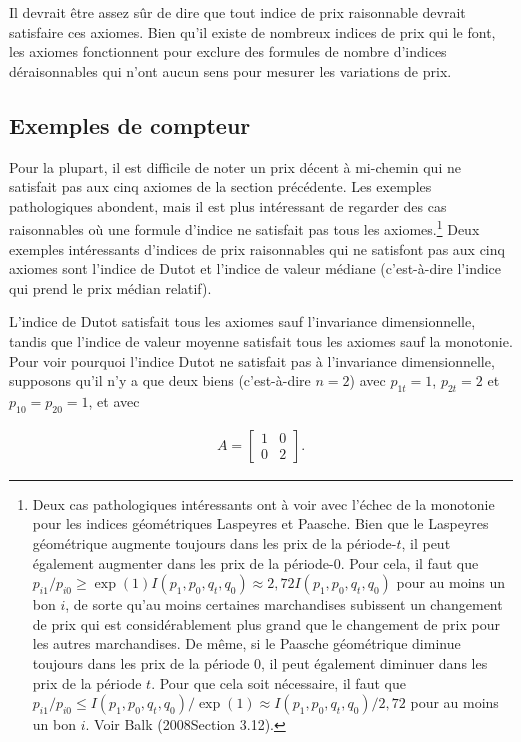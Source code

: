 \documentclass[
]{article}
\begin{document}
Il devrait être assez sûr de dire que tout indice de prix raisonnable devrait satisfaire ces axiomes. Bien qu'il existe de nombreux indices de prix qui le font, les axiomes fonctionnent pour exclure des formules de nombre d'indices déraisonnables qui n'ont aucun sens pour mesurer les variations de prix.

\hypertarget{exemples-de-compteur}{%
\subsection{Exemples de compteur}\label{exemples-de-compteur}}

Pour la plupart, il est difficile de noter un prix décent à mi-chemin qui ne satisfait pas aux cinq axiomes de la section précédente. Les exemples pathologiques abondent, mais il est plus intéressant de regarder des cas raisonnables où une formule d'indice ne satisfait pas tous les axiomes.\footnote{Deux cas pathologiques intéressants ont à voir avec l'échec de la monotonie pour les indices géométriques Laspeyres et Paasche. Bien que le Laspeyres géométrique augmente toujours dans les prix de la période-\(t\), il peut également augmenter dans les prix de la période-0. Pour cela, il faut que \(p_{i1} / p_{i0} \geq \exp(1) I(p_{1}, p_{0}, q_{t}, q_{0}) \approx 2,72 I(p_{1}, p_{0}, q_{t}, q_{0})\) pour au moins un bon \(i\), de sorte qu'au moins certaines marchandises subissent un changement de prix qui est considérablement plus grand que le changement de prix pour les autres marchandises. De même, si le Paasche géométrique diminue toujours dans les prix de la période 0, il peut également diminuer dans les prix de la période \(t\). Pour que cela soit nécessaire, il faut que \(p_{i1} / p_{i0} \leq I(p_{1}, p_{0}, q_{t}, q_{0}) / \exp(1) \approx I(p_{1}, p_{0}, q_{t}, q_{0}) / 2,72\) pour au moins un bon \(i\). Voir Balk (2008Section 3.12).} Deux exemples intéressants d'indices de prix raisonnables qui ne satisfont pas aux cinq axiomes sont l'indice de Dutot et l'indice de valeur médiane (c'est-à-dire l'indice qui prend le prix médian relatif).

L'indice de Dutot satisfait tous les axiomes sauf l'invariance dimensionnelle, tandis que l'indice de valeur moyenne satisfait tous les axiomes sauf la monotonie. Pour voir pourquoi l'indice Dutot ne satisfait pas à l'invariance dimensionnelle, supposons qu'il n'y a que deux biens (c'est-à-dire \(n = 2\)) avec \(p_{1t} = 1\), \(p_{2t} = 2\) et \(p_{10} = p_{20} = 1\), et avec

\begin{align*}
A =
\begin{bmatrix}
1 & 0 \\
0 & 2
\end{bmatrix}.
\end{align*}
\end{document}
